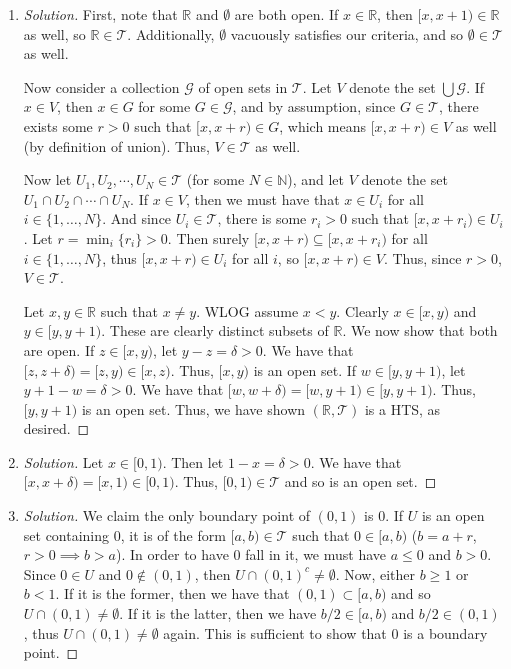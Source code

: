 \documentclass{article}
\newcommand{\N}{{\mathbb N}}
\newcommand{\R}{{\mathbb R}}
\begin{document}
\begin{enumerate}
	\item \begin{proof}[Solution]\let\qed\relax
		First, note that $\R$ and $\emptyset$ are both open.
		If $x \in \R$, then $[x,x+1) \in \R$ as well, so $\R \in \mathcal{T}$.
		Additionally, $\emptyset$ vacuously satisfies our criteria,
		and so $\emptyset \in \mathcal{T}$ as well.

		Now consider a collection $\mathcal{G}$ of open sets in $\mathcal{T}$.
		Let $V$ denote the set $\bigcup \mathcal{G}$.
		If $x \in V$, then $x \in G$ for some $G \in \mathcal{G}$,
		and by assumption, since $G \in \mathcal{T}$,
		there exists some $r>0$ such that $[x,x+r) \in G$,
		which means $[x,x+r) \in V$ as well (by definition of union).
		Thus, $V \in \mathcal{T}$ as well.

		Now let $U_1, U_2, \cdots , U_N \in \mathcal{T}$ (for some $N \in \N$),
		and let $V$ denote the set $U_1 \cap U_2 \cap \cdots \cap U_N$.
		If $x \in V$, then we must have that $x \in U_i$ for all $i \in \{1,\dots,N\}$.
		And since $U_i \in \mathcal{T}$, there is some $r_i>0$ such that
		$[x, x+r_i) \in U_i$.
		Let $r = \min_i\{r_i\} > 0$.
		Then surely $[x, x+r) \subseteq [x, x+r_i)$ for all $i \in \{1,\dots,N\}$,
		thus $[x, x+r) \in U_i$ for all $i$,
		so $[x, x+r) \in V$.
		Thus, since $r>0$, $V \in \mathcal{T}$.

		Let $x,y \in \R$ such that $x \neq y$.
		WLOG assume $x < y$.
		Clearly $x \in [x,y)$ and $y \in [y,y+1)$.
		These are clearly distinct subsets of $\R$.
		We now show that both are open.
		If $z \in [x,y)$,
		let $y - z = \delta > 0$.
		We have that $[z, z + \delta) = [z,y) \in [x,z)$.
		Thus, $[x,y)$ is an open set.
		If $w \in [y,y+1)$,
		let $y +1 - w = \delta > 0$.
		We have that $[w, w + \delta) = [w,y+1) \in [y,y+1)$.
		Thus, $[y,y+1)$ is an open set.
		Thus, we have shown $(\R,\mathcal{T})$ is a HTS, as desired.
	\end{proof}
	\item \begin{proof}[Solution]\let\qed\relax
		Let $x \in [0,1)$.
		Then let $1 - x = \delta > 0$.
		We have that $[x, x + \delta) = [x,1) \in [0,1)$.
		Thus, $[0,1) \in \mathcal{T}$ and so is an open set.
	\end{proof}
	\item \begin{proof}[Solution]\let\qed\relax
		We claim the only boundary point of $(0,1)$ is $0$.
		If $U$ is an open set containing $0$,
		it is of the form $[a,b)\in\mathcal{T}$ such that $0 \in [a,b)$
		($b = a + r$, $r > 0 \implies b > a$).
		In order to have $0$ fall in it, we must have $a \leq 0$ and $b > 0$.
		Since $0\in U$ and $0 \not\in (0,1)$, then $U \cap (0,1)^c \neq \emptyset$.
		Now, either $b \geq 1$ or $ b < 1$.
		If it is the former, then we have that $(0,1) \subset [a,b)$
		and so $U \cap (0,1) \neq \emptyset$.
		If it is the latter, then we have $b/2 \in [a,b)$ and $b/2 \in (0,1)$,
		thus $U \cap (0,1) \neq \emptyset$ again.
		This is sufficient to show that $0$ is a boundary point.
		

\end{proof}
\end{enumerate}
\end{document}
